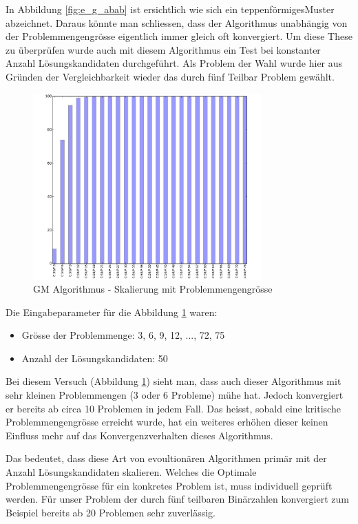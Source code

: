 In Abbildung \ref{fig:e_g_abab} ist ersichtlich wie sich ein \flqq teppenförmiges\frqq Muster abzeichnet. Daraus könnte man schliessen, dass der Algorithmus unabhängig von der Problemmengengrösse eigentlich immer gleich oft konvergiert. Um diese These zu überprüfen wurde auch mit diesem Algorithmus ein Test bei konstanter Anzahl Lösungskandidaten durchgeführt. Als Problem der Wahl wurde hier aus Gründen der Vergleichbarkeit wieder das durch fünf Teilbar Problem gewählt.
\begin{figure}[H]
  \centering
  \includegraphics[width=0.78\textwidth]{images/E_G_PS_div5PS_solved.pdf}
  \caption[GM Algorithmus - Skalierung mit Problemmengengrösse]{GM Algorithmus - Skalierung mit Problemmengengrösse}
  \label{fig:e_g_ps_div5}
\end{figure}
\pagebreak
Die Eingabeparameter für die Abbildung \ref{fig:e_g_ps_div5} waren:
\begin{itemize}
	\item Grösse der Problemmenge: 3, 6, 9, 12, ..., 72, 75
	\item Anzahl der Lösungskandidaten: 50
\end{itemize}

Bei diesem Versuch (Abbildung \ref{fig:e_g_ps_div5}) sieht man, dass auch dieser Algorithmus mit sehr kleinen Problemmengen ($3$ oder $6$ Probleme) mühe hat. Jedoch konvergiert er bereits ab circa 10 Problemen in jedem Fall. Das heisst, sobald eine kritische Problemmengengrösse erreicht wurde, hat ein weiteres erhöhen dieser keinen Einfluss mehr auf das Konvergenzverhalten dieses Algorithmus.

Das bedeutet, dass diese Art von evoultionären Algorithmen primär mit der Anzahl Lösungskandidaten skalieren. Welches die Optimale Problemmengengrösse für ein konkretes Problem ist, muss individuell geprüft werden. Für unser Problem der durch fünf teilbaren Binärzahlen konvergiert zum Beispiel bereits ab 20 Problemen sehr zuverlässig.

